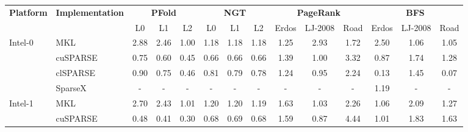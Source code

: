 \begin{table}[t]
  \centering
  \footnotesize
  \begin{tabular}{ll|ccc|ccc|ccc|ccc}
    \multirow{2}{*}{\textbf{Platform}} &
    \multirow{2}{*}{\textbf{Implementation}} &
    \multicolumn{3}{c}{\textbf{PFold}} & \multicolumn{3}{c}{\textbf{NGT}} &
    \multicolumn{3}{c}{\textbf{PageRank}} & \multicolumn{3}{c}{\textbf{BFS}} \\[-0.3em]
    & & \hspace{0.8em}L0\hspace{0.8em} & \hspace{0.8em}L1\hspace{0.8em} & \hspace{0.8em}L2\hspace{0.8em}
      & \hspace{0.8em}L0\hspace{0.8em} & \hspace{0.8em}L1\hspace{0.8em} & \hspace{0.8em}L2\hspace{0.8em}
      & \hspace{0.35em}Erdos\hspace{0.35em} & LJ-2008 & \hspace{0.35em}Road\hspace{0.35em}
      & \hspace{0.35em}Erdos\hspace{0.35em} & LJ-2008 & \hspace{0.35em}Road\hspace{0.35em} \\
    \hline
    \hline
    \multirow{3}{*}{Intel-0} 
    & MKL & 2.88 & 2.46 & 1.00 & 1.18 & 1.18 & 1.18 & 1.25 & 2.93 & 1.72 & 2.50 & 1.06 & 1.05 \\[-0.3em]
    & cuSPARSE & 0.75 & 0.60 & 0.45 & 0.66 & 0.66 & 0.66 & 1.39 & 1.00 & 3.32 & 0.87 & 1.74 & 1.28 \\[-0.3em]
    & clSPARSE & 0.90 & 0.75 & 0.46 & 0.81 & 0.79 & 0.78 & 1.24 & 0.95 & 2.24 & 0.13 & 1.45 & 0.07 \\[-0.3em]
    & SparseX & - & - & - & - & - & - & - & - & - & 1.19 & - & - \\
    \hline
    \multirow{3}{*}{Intel-1}
    & MKL & 2.70 & 2.43 & 1.01 & 1.20 & 1.20 & 1.19 & 1.63 & 1.03 & 2.26 & 1.06 & 2.09 & 1.27 \\[-0.3em]
    & cuSPARSE & 0.48 & 0.41 & 0.30 & 0.68 & 0.69 & 0.68 & 1.59 & 0.87 & 4.44 & 1.01 & 1.83 & 1.63 \\[-0.3em]

\end{tabular}
\end{table}
